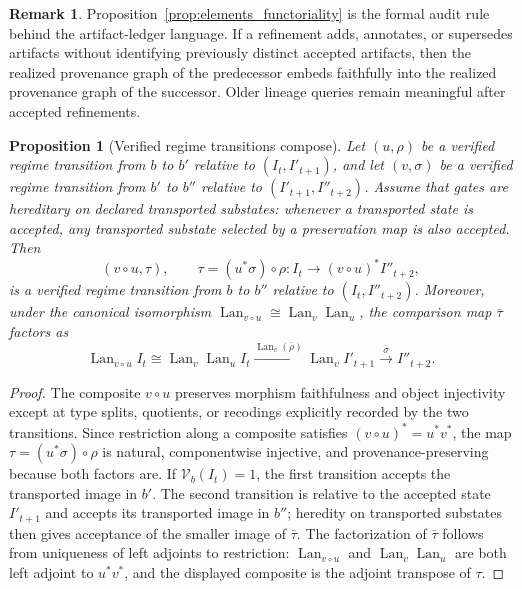 \documentclass[11pt]{article}
\newtheorem{proposition}[theorem]{Proposition}
\theoremstyle{definition}
\newtheorem{remark}{Remark}
\newcommand{\V}{\mathcal{V}}
\newcommand{\Lan}{\operatorname{Lan}}
\begin{document}
\begin{remark}
Proposition~\ref{prop:elements_functoriality} is the formal audit rule behind the artifact-ledger language. If a refinement adds, annotates, or supersedes artifacts without identifying previously distinct accepted artifacts, then the realized provenance graph of the predecessor embeds faithfully into the realized provenance graph of the successor. Older lineage queries remain meaningful after accepted refinements.
\end{remark}

\begin{proposition}[Verified regime transitions compose]
\label{prop:transition_composition}
Let $(u,\rho)$ be a verified regime transition from $b$ to $b'$ relative to $(I_t,I'_{t+1})$, and let $(v,\sigma)$ be a verified regime transition from $b'$ to $b''$ relative to $(I'_{t+1},I''_{t+2})$. Assume that gates are hereditary on declared transported substates: whenever a transported state is accepted, any transported substate selected by a preservation map is also accepted. Then
\[
(v\circ u,\tau),\qquad
\tau=(u^*\sigma)\circ\rho:I_t\longrightarrow (v\circ u)^*I''_{t+2},
\]
is a verified regime transition from $b$ to $b''$ relative to $(I_t,I''_{t+2})$. Moreover, under the canonical isomorphism $\Lan_{v\circ u}\cong \Lan_v\Lan_u$, the comparison map $\bar\tau$ factors as
\[
\Lan_{v\circ u}I_t \cong \Lan_v\Lan_u I_t
\xrightarrow{\Lan_v(\bar\rho)}
\Lan_v I'_{t+1}
\xrightarrow{\bar\sigma}
I''_{t+2}.
\]
\end{proposition}

\begin{proof}
The composite $v\circ u$ preserves morphism faithfulness and object injectivity except at type splits, quotients, or recodings explicitly recorded by the two transitions. Since restriction along a composite satisfies $(v\circ u)^*=u^*v^*$, the map $\tau=(u^*\sigma)\circ\rho$ is natural, componentwise injective, and provenance-preserving because both factors are. If $\V_b(I_t)=1$, the first transition accepts the transported image in $b'$. The second transition is relative to the accepted state $I'_{t+1}$ and accepts its transported image in $b''$; heredity on transported substates then gives acceptance of the smaller image of $\bar\tau$. The factorization of $\bar\tau$ follows from uniqueness of left adjoints to restriction: $\Lan_{v\circ u}$ and $\Lan_v\Lan_u$ are both left adjoint to $u^*v^*$, and the displayed composite is the adjoint transpose of $\tau$.
\end{proof}
\end{document}
